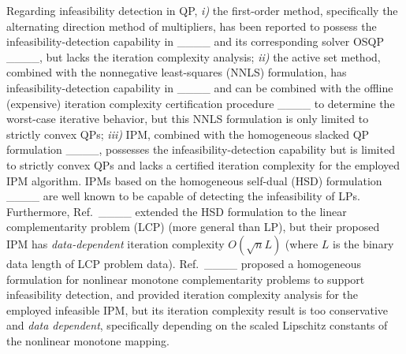 Regarding infeasibility detection in QP, \textit{i)} the first-order method, specifically the alternating direction method of multipliers, has been reported to possess the infeasibility-detection capability in ____ and its corresponding solver OSQP ____, but lacks the iteration complexity analysis; \textit{ii)} the active set method, combined with the nonnegative least-squares (NNLS) formulation, has infeasibility-detection capability in ____ and can be combined with the offline (expensive) iteration complexity certification procedure ____ to determine the worst-case iterative behavior, but this NNLS formulation is only limited to strictly convex QPs; \textit{iii)} IPM, combined with the homogeneous slacked QP formulation ____, possesses the infeasibility-detection capability but is limited to strictly convex QPs and lacks a certified iteration complexity for the employed IPM algorithm. IPMs based on the homogeneous self-dual (HSD) formulation ____ are well known to be capable of detecting the infeasibility of LPs. Furthermore, Ref.\ ____ extended the HSD formulation to the linear complementarity problem (LCP) (more general than LP), but their proposed IPM has \textit{data-dependent} iteration complexity $O(\sqrt{n}L)$ (where $L$ is the binary data length of LCP problem data). Ref.\ ____ proposed a homogeneous formulation for nonlinear monotone complementarity problems to support infeasibility detection, and provided iteration complexity analysis for the employed infeasible IPM, but its iteration complexity result is too conservative and  \textit{data dependent}, specifically depending on the scaled Lipschitz constants of the nonlinear monotone mapping.